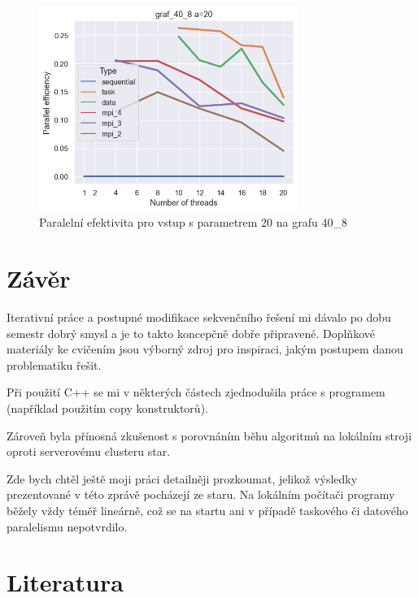 \documentclass[epsf,epic,eepic,eepicemu]{article}\oddsidemargin=-5mm
\begin{document}
\begin{figure}
\centering
\includegraphics[width=0.75\textwidth]{images/efficency_20__40_8}
\caption{Paralelní efektivita pro vstup s parametrem 20 na grafu 40\_8}
\label{fig:efficency_20__40_8}
\end{figure}

\section{Závěr}

Iterativní práce a postupné modifikace sekvenčního řešení mi dávalo po dobu semestr dobrý smysl a je to takto koncepčně dobře připravené. Doplňkové materiály ke cvičením jsou výborný zdroj pro inspiraci, jakým postupem danou problematiku řešit.

Při použití C++ se mi v některých částech zjednodušila práce s programem (například použitím copy konstruktorů).

Zároveň byla přínosná zkušenost s porovnáním běhu algoritmů na lokálním stroji oproti serverovému clusteru star.

Zde bych chtěl ještě moji práci detailněji prozkoumat, jelikož výsledky prezentované v této zprávě pocházejí ze staru. Na lokálním počítači programy běžely vždy téměř lineárně, což se na startu ani v případě taskového či datového paralelismu nepotvrdilo.

\section{Literatura}



\end{document}
